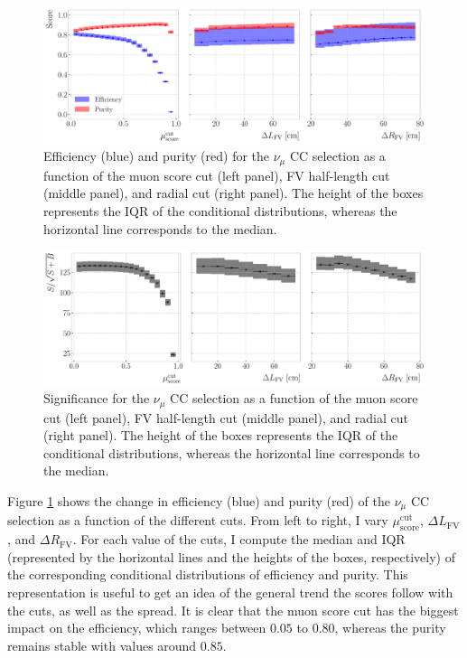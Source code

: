\begin{figure}[t]
    \centering
    \includegraphics[width=.99\linewidth]{Images/GAr_selection/efficiency_and_purity_error_boxes.pdf}
    \caption[Efficiency and purity for the $\nu_{\mu}$ CC selection as a function of the different cuts.]{Efficiency (blue) and purity (red) for the $\nu_{\mu}$ CC selection as a function of the muon score cut (left panel), FV half-length cut (middle panel), and radial cut (right panel). The height of the boxes represents the IQR of the conditional distributions, whereas the horizontal line corresponds to the median.}
    \label{fig:numuCC_metrics_opt}
\end{figure}

\begin{figure}[t]
    \centering
    \includegraphics[width=.99\linewidth]{Images/GAr_selection/significance_error_boxes.pdf}
    \caption[Significance for the $\nu_{\mu}$ CC selection as a function of the different cuts.]{Significance for the $\nu_{\mu}$ CC selection as a function of the muon score cut (left panel), FV half-length cut (middle panel), and radial cut (right panel). The height of the boxes represents the IQR of the conditional distributions, whereas the horizontal line corresponds to the median.}
    \label{fig:numuCC_significance_opt}
\end{figure}

Figure \ref{fig:numuCC_metrics_opt} shows the change in efficiency (blue) and purity (red) of the $\nu_{\mu}$ CC selection as a function of the different cuts. From left to right, I vary $\mu_{\mathrm{score}}^{\mathrm{cut}}$, $\Delta L_{\mathrm{FV}}$, and $\Delta R_{\mathrm{FV}}$. For each value of the cuts, I compute the median and IQR (represented by the horizontal lines and the heights of the boxes, respectively) of the corresponding conditional distributions of efficiency and purity. This representation is useful to get an idea of the general trend the scores follow with the cuts, as well as the spread. It is clear that the muon score cut has the biggest impact on the efficiency, which ranges between $0.05$ to $0.80$, whereas the purity remains stable with values around $0.85$.

